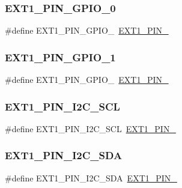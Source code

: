 \subsubsection{\texorpdfstring{EXT1\_PIN\_GPIO\_0}{EXT1\_PIN\_GPIO\_0}}
{\footnotesize\ttfamily \#define E\+X\+T1\+\_\+\+P\+I\+N\+\_\+\+G\+P\+I\+O\+\_~\mbox{\hyperlink{group__samd21__xplained__pro__features__group_ga5ca695ea694bce97dfb20e52de5b4a15}{E\+X\+T1\+\_\+\+P\+I\+N\+\_}}}

\mbox{\label{group__samd21__xplained__pro__features__group_ga694376ccdf6ec8fb0101121fe0dd2bd6}} 
\subsubsection{\texorpdfstring{EXT1\_PIN\_GPIO\_1}{EXT1\_PIN\_GPIO\_1}}
{\footnotesize\ttfamily \#define E\+X\+T1\+\_\+\+P\+I\+N\+\_\+\+G\+P\+I\+O\+\_~\mbox{\hyperlink{group__samd21__xplained__pro__features__group_ga6c808d0df1d56c22b669269ba2a8ccce}{E\+X\+T1\+\_\+\+P\+I\+N\+\_}}}

\mbox{\label{group__samd21__xplained__pro__features__group_gafb74ad5b3722338a90e035f2b0826cb5}} 
\subsubsection{\texorpdfstring{EXT1\_PIN\_I2C\_SCL}{EXT1\_PIN\_I2C\_SCL}}
{\footnotesize\ttfamily \#define E\+X\+T1\+\_\+\+P\+I\+N\+\_\+\+I2\+C\+\_\+\+S\+CL~\mbox{\hyperlink{group__samd21__xplained__pro__features__group_ga7e54c69b2687572b6477c1618f0a9269}{E\+X\+T1\+\_\+\+P\+I\+N\+\_}}}

\mbox{\label{group__samd21__xplained__pro__features__group_gad156fbb2d37c755c94cf9980c82689ba}} 
\subsubsection{\texorpdfstring{EXT1\_PIN\_I2C\_SDA}{EXT1\_PIN\_I2C\_SDA}}
{\footnotesize\ttfamily \#define E\+X\+T1\+\_\+\+P\+I\+N\+\_\+\+I2\+C\+\_\+\+S\+DA~\mbox{\hyperlink{group__samd21__xplained__pro__features__group_gab0c46ea18840c81fc2257547f8af3c57}{E\+X\+T1\+\_\+\+P\+I\+N\+\_}}}

